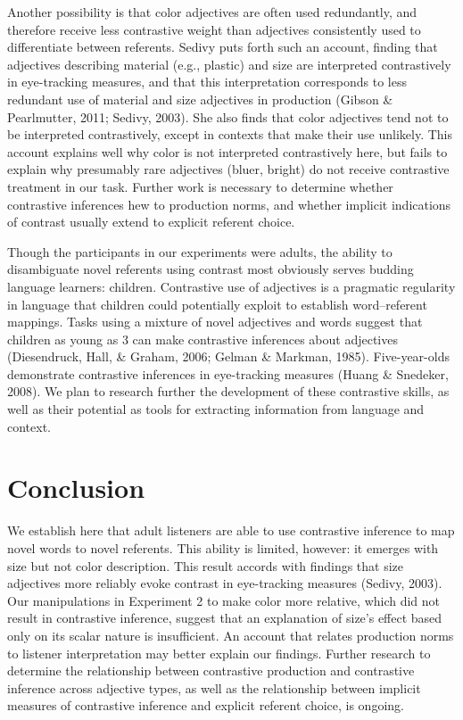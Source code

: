 \documentclass[10pt, letterpaper]{article}
\begin{document}
Another possibility is that color adjectives are often used redundantly,
and therefore receive less contrastive weight than adjectives
consistently used to differentiate between referents. Sedivy puts forth
such an account, finding that adjectives describing material (e.g.,
plastic) and size are interpreted contrastively in eye-tracking
measures, and that this interpretation corresponds to less redundant use
of material and size adjectives in production (Gibson \& Pearlmutter,
2011; Sedivy, 2003). She also finds that color adjectives tend not to be
interpreted contrastively, except in contexts that make their use
unlikely. This account explains well why color is not interpreted
contrastively here, but fails to explain why presumably rare adjectives
(bluer, bright) do not receive contrastive treatment in our task.
Further work is necessary to determine whether contrastive inferences
hew to production norms, and whether implicit indications of contrast
usually extend to explicit referent choice.

Though the participants in our experiments were adults, the ability to
disambiguate novel referents using contrast most obviously serves
budding language learners: children. Contrastive use of adjectives is a
pragmatic regularity in language that children could potentially exploit
to establish word--referent mappings. Tasks using a mixture of novel
adjectives and words suggest that children as young as 3 can make
contrastive inferences about adjectives (Diesendruck, Hall, \& Graham,
2006; Gelman \& Markman, 1985). Five-year-olds demonstrate contrastive
inferences in eye-tracking measures (Huang \& Snedeker, 2008). We plan
to research further the development of these contrastive skills, as well
as their potential as tools for extracting information from language and
context.

\section{Conclusion}\label{conclusion}

We establish here that adult listeners are able to use contrastive
inference to map novel words to novel referents. This ability is
limited, however: it emerges with size but not color description. This
result accords with findings that size adjectives more reliably evoke
contrast in eye-tracking measures (Sedivy, 2003). Our manipulations in
Experiment 2 to make color more relative, which did not result in
contrastive inference, suggest that an explanation of size's effect
based only on its scalar nature is insufficient. An account that relates
production norms to listener interpretation may better explain our
findings. Further research to determine the relationship between
contrastive production and contrastive inference across adjective types,
as well as the relationship between implicit measures of contrastive
inference and explicit referent choice, is ongoing.
\end{document}
